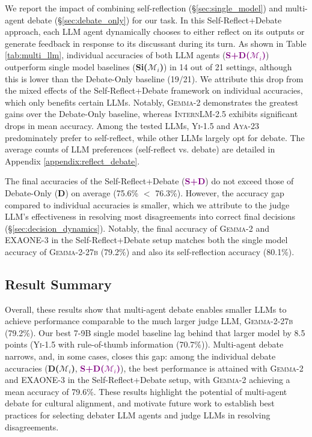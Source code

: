 We report the impact of combining  self-reflection (\S \ref{sec:single_model}) and multi-agent debate (\S \ref{sec:debate_only}) for our task. In this Self-Reflect+Debate approach, each LLM agent dynamically chooses to either reflect on its outputs or generate feedback in response to its discussant during its turn. As shown in Table \ref{tab:multi_llm}, individual accuracies of both LLM agents (\textcolor{purple}{\textbf{S+D($\mathcal{M}_i$)}}) outperform single model baselines (\textbf{Si($\mathcal{M}_i$)}) in 14 out of 21 settings, although this is lower than the Debate-Only baseline (19/21). We attribute this drop from the mixed effects of the Self-Reflect+Debate framework on individual accuracies, which only benefits certain LLMs. Notably, \textsc{Gemma-2} demonstrates the greatest gains over the Debate-Only baseline, whereas \textsc{InternLM-2.5} exhibits significant drops in mean accuracy. Among the tested LLMs, \textsc{Yi-1.5} and \textsc{Aya-23} predominately prefer to self-reflect, while other LLMs largely opt for debate. The average counts of LLM preferences (self-reflect vs. debate) are detailed in Appendix \ref{appendix:reflect_debate}.

The final accuracies of the Self-Reflect+Debate (\textcolor{purple}{\textbf{S+D}}) do not exceed those of Debate-Only (\textcolor{rred}{\textbf{D}}) on average (75.6\% $<$ 76.3\%). However, the accuracy gap compared to individual accuracies is smaller, which we attribute to the judge LLM's effectiveness in resolving most disagreements into correct final decisions (\S \ref{sec:decision_dynamics}). Notably, the final accuracy of \textsc{Gemma-2} and \textsc{EXAONE-3} in the Self-Reflect+Debate setup matches both the single model accuracy of \textsc{Gemma-2-27b} (79.2\%) and also its self-reflection accuracy (80.1\%).





\subsection{Result Summary}

Overall, these results show that multi-agent debate enables smaller LLMs to achieve performance comparable to the much larger judge LLM, \textsc{Gemma-2-27b} (79.2\%). Our best 7-9B single model baseline lag behind that larger model by 8.5 points (\textsc{Yi-1.5} with rule-of-thumb information (70.7\%)). Multi-agent debate narrows, and, in some cases, closes this gap: among the individual debate accuracies (\textcolor{rred}{\textbf{D($\mathcal{M}_i$)}}, \textcolor{purple}{\textbf{S+D($\mathcal{M}_i$)}}), the best performance is attained with \textsc{Gemma-2} and \textsc{EXAONE-3} in the Self-Reflect+Debate setup, with \textsc{Gemma-2} achieving a mean accuracy of 79.6\%. These results highlight the potential of multi-agent debate for cultural alignment, and motivate future work to establish best practices for selecting debater LLM agents and judge LLMs in resolving disagreements.

